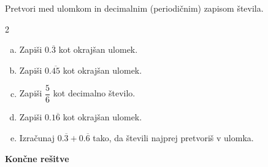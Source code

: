 \documentclass[a4paper,12pt]{letter}
\begin{document}
\begin{naloga}
Pretvori med ulomkom in decimalnim (periodi\v{c}nim) zapisom \v{s}tevila.

\begin{multicols}{2}
\begin{enumerate}[a.)]
\item Zapi\v{s}i $0.\overline{3}$ kot okraj\v{s}an ulomek.
\item Zapi\v{s}i $0.\overline{45}$ kot okraj\v{s}an ulomek.
\item Zapi\v{s}i $\dfrac{5}{6}$ kot decimalno \v{s}tevilo.
\item Zapi\v{s}i $0.1\overline{6}$ kot okraj\v{s}an ulomek.
\item Izra\v{c}unaj $0.\overline{3}+0.\overline{6}$ tako, da \v{s}tevili najprej pretvori\v{s} v ulomka.
\end{enumerate}
\end{multicols}
\end{naloga}

\vfill
\begin{center}
\end{center}

\newpage
\begin{center}
{\Large\textbf{Kon\v{c}ne re\v{s}itve}}
\end{center}
\vspace{0.3cm}
\end{document}
